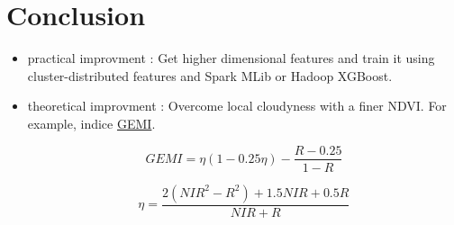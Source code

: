 \documentclass[c]{beamer}
\begin{document}
\section{Conclusion}
\begin{frame}
 \begin{itemize}
  \item practical improvment : Get higher dimensional features and train it using cluster-distributed features and Spark MLib or Hadoop XGBoost. 
  \item theoretical improvment : Overcome local cloudyness with a finer NDVI. For example, indice \href{http://e-cours.univ-paris1.fr/modules/uved/envcal/html/vegetation/indices/qques-indices/indices-effets-atmosphere.html}{GEMI}.
  
\[GEMI=\eta(1-0.25\eta)-\frac{R-0.25}{1-R}\]

\[\eta=\frac{2(NIR^2-R^2)+1.5NIR+0.5R}{NIR+R}\]

 \end{itemize}

\end{frame}
\end{document}
